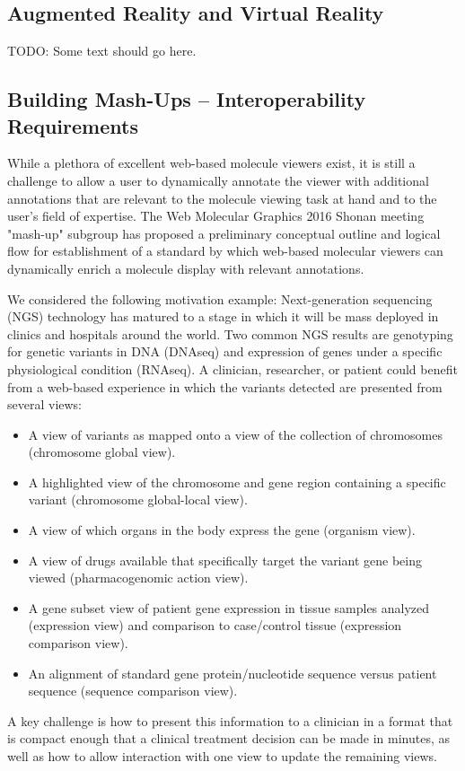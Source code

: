 \documentclass[a4paper]{article}
\begin{document}
\subsection{Augmented Reality and Virtual Reality}

TODO: Some text should go here.

\subsection{Building Mash-Ups -- Interoperability Requirements}

While a plethora of excellent web-based molecule viewers exist, it is still a challenge to allow a user to dynamically annotate the viewer with additional annotations that are relevant to the molecule viewing task at hand and to the user's field of expertise. The Web Molecular Graphics 2016 Shonan meeting "mash-up" subgroup has proposed a preliminary conceptual outline and logical flow for establishment of a standard by which web-based molecular viewers can dynamically enrich a molecule display with relevant annotations.

We considered the following motivation example: Next-generation sequencing (NGS) technology has matured to a stage in which it will be mass deployed in clinics and hospitals around the world.  Two common NGS results are genotyping for genetic variants in DNA (DNAseq) and expression of genes under a specific physiological condition (RNAseq).  
A clinician, researcher, or patient could benefit from a web-based experience in which the variants detected are presented from several views:
\begin{itemize}
\item A view of variants as mapped onto a view of the collection of chromosomes (chromosome global view).
\item A highlighted view of the chromosome and gene region containing a specific variant (chromosome global-local view).
\item A view of which organs in the body express the gene (organism view).
\item A view of drugs available that specifically target the variant gene being viewed (pharmacogenomic action view).
\item A gene subset view of patient gene expression in tissue samples analyzed (expression view) and comparison to case/control tissue (expression comparison view).
\item An alignment of standard gene protein/nucleotide sequence versus patient sequence (sequence comparison view).
\end{itemize}
A key challenge is how to present this information to a clinician in a format that is compact enough that a clinical treatment decision can be made in minutes, as well as how to allow interaction with one view to update the remaining views.
\end{document}

